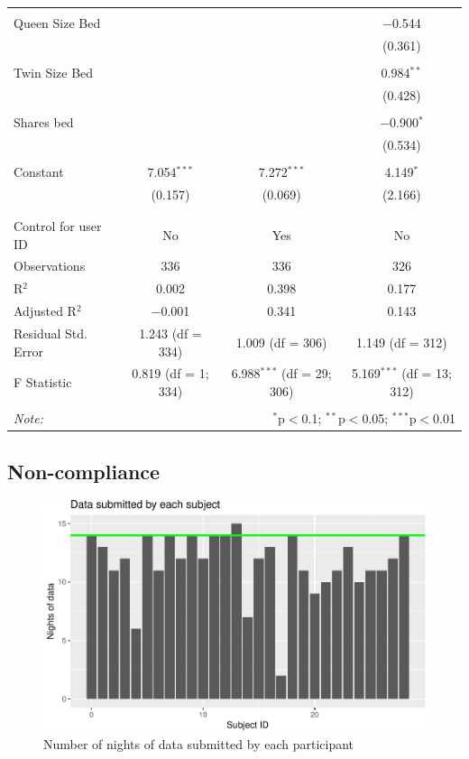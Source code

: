 \documentclass[12pt,]{article}
\begin{document}
\begin{table}[!htbp]
\begin{tabular}{@{\extracolsep{5pt}}lccc}
  & & & \\ 
 Queen Size Bed &  &  & $-$0.544 \\ 
  &  &  & (0.361) \\ 
  & & & \\ 
 Twin Size Bed &  &  & 0.984$^{**}$ \\ 
  &  &  & (0.428) \\ 
  & & & \\ 
 Shares bed &  &  & $-$0.900$^{*}$ \\ 
  &  &  & (0.534) \\ 
  & & & \\ 
 Constant & 7.054$^{***}$ & 7.272$^{***}$ & 4.149$^{*}$ \\ 
  & (0.157) & (0.069) & (2.166) \\ 
  & & & \\ 
\hline \\[-1.8ex] 
Control for user ID & No & Yes & No \\ 
Observations & 336 & 336 & 326 \\ 
R$^{2}$ & 0.002 & 0.398 & 0.177 \\ 
Adjusted R$^{2}$ & $-$0.001 & 0.341 & 0.143 \\ 
Residual Std. Error & 1.243 (df = 334) & 1.009 (df = 306) & 1.149 (df = 312) \\ 
F Statistic & 0.819 (df = 1; 334) & 6.988$^{***}$ (df = 29; 306) & 5.169$^{***}$ (df = 13; 312) \\ 
\hline 
\hline \\[-1.8ex] 
\textit{Note:}  & \multicolumn{3}{r}{$^{*}$p$<$0.1; $^{**}$p$<$0.05; $^{***}$p$<$0.01} \\ 
\end{tabular} 
\end{table}

\subsection{Non-compliance}\label{non-compliance}

\begin{figure}
\centering
\includegraphics{report_files/figure-latex/days_used-1.pdf}
\caption{\label{fig:days_used} Number of nights of data submitted by
each participant}
\end{figure}
\end{document}
